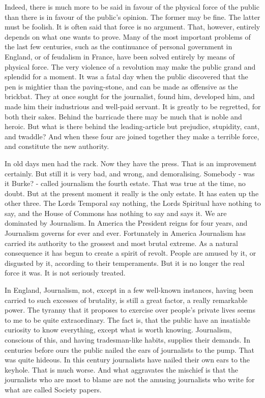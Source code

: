 Indeed, there is much more to be said in favour of the physical force of the public than there is in favour of the public’s opinion. The former may be fine. The latter must be foolish. It is often said that force is no argument. That, however, entirely depends on what one wants to prove. Many of the most important problems of the last few centuries, such as the continuance of personal government in England, or of feudalism in France, have been solved entirely by means of physical force. The very violence of a revolution may make the public grand and splendid for a moment. It was a fatal day when the public discovered that the pen is mightier than the paving-stone, and can be made as offensive as the brickbat. They at once sought for the journalist, found him, developed him, and made him their industrious and well-paid servant. It is greatly to be regretted, for both their sakes. Behind the barricade there may be much that is noble and heroic. But what is there behind the leading-article but prejudice, stupidity, cant, and twaddle? And when these four are joined together they make a terrible force, and constitute the new authority.\par

In old days men had the rack. Now they have the press. That is an improvement certainly. But still it is very bad, and wrong, and demoralising. Somebody - was it Burke? - called journalism the fourth estate. That was true at the time, no doubt. But at the present moment it really is the only estate. It has eaten up the other three. The Lords Temporal say nothing, the Lords Spiritual have nothing to say, and the House of Commons has nothing to say and says it. We are dominated by Journalism. In America the President reigns for four years, and Journalism governs for ever and ever. Fortunately in America Journalism has carried its authority to the grossest and most brutal extreme. As a natural consequence it has begun to create a spirit of revolt. People are amused by it, or disgusted by it, according to their temperaments. But it is no longer the real force it was. It is not seriously treated.\par

In England, Journalism, not, except in a few well-known instances, having been carried to such excesses of brutality, is still a great factor, a really remarkable power. The tyranny that it proposes to exercise over people’s private lives seems to me to be quite extraordinary. The fact is, that the public have an insatiable curiosity to know everything, except what is worth knowing. Journalism, conscious of this, and having tradesman-like habits, supplies their demands. In centuries before ours the public nailed the ears of journalists to the pump. That was quite hideous. In this century journalists have nailed their own ears to the keyhole. That is much worse. And what aggravates the mischief is that the journalists who are most to blame are not the amusing journalists who write for what are called Society papers.\par

